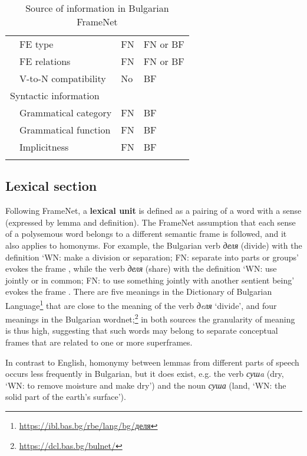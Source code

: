 \documentclass[output=paper,colorlinks,citecolor=brown]{langscibook}
\begin{document}
\begin{table}
\begin{tabular}{llll}
     & FE type & FN & FN or BF \\
     & FE relations & FN & FN or BF \\  
     & V-to-N compatibility & No & BF \\
     \multicolumn{4}{l}{Syntactic information}\\
     & Grammatical category  & FN  & BF \\
     & Grammatical function &  FN & BF \\
     & Implicitness & FN & BF \\
    \lspbottomrule
    \end{tabular}
    \caption{Source of information in Bulgarian FrameNet}
    \label{tab:my_label2}
\end{table}

\subsection{Lexical section} 

Following FrameNet, a \textbf{lexical unit} is defined as a pairing of a word with a sense \citep[235]{Fillmore2003} (expressed by lemma and definition). The FrameNet assumption that each sense of a polysemous word belongs to a different semantic frame is followed, and it also applies to homonyms. For example, the Bulgarian verb \emph{деля} (divide) with the definition `WN: make a division or separation; FN: separate into parts or groups' evokes the frame , while the verb \emph{деля} (share) with the definition `WN: use jointly or in common; FN: to use something jointly with another sentient being' evokes the frame . There are five meanings in the Dictionary of Bulgarian Language\footnote{\scriptsize\url{https://ibl.bas.bg/rbe/lang/bg/деля}} that are close to the meaning of the verb \emph{дeля} `divide', and four meanings in the Bulgarian wordnet;\footnote{\scriptsize\url{https://dcl.bas.bg/bulnet/}} in both sources the granularity of meaning is thus high, suggesting that such words may belong to separate conceptual frames that are related to one or more superframes.

In contrast to English, homonymy between lemmas from different parts of speech occurs less frequently in Bulgarian, but it does exist, e.g. the verb \textit{сушa} (dry, `WN: to remove moisture and make dry') and the noun \textit{суша} (land, `WN: the solid part of the earth's surface').
\end{document}
